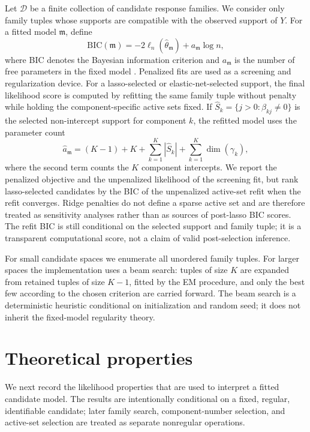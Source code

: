 Let \(\mathcal D\) be a finite collection of candidate response families.  We
consider only family tuples whose supports are compatible with the observed
support of \(Y\).  For a fitted model \(\mathfrak m\), define
\[
    \mathrm{BIC}(\mathfrak m)
    =
    -2\ell_n(\hat\theta_{\mathfrak m})
    +
    a_{\mathfrak m}\log n,
\]
where BIC denotes the Bayesian information criterion and
\(a_{\mathfrak m}\) is the number of free parameters in the fixed model
\citep{schwarz1978dimensions}.
Penalized fits are used as a screening and regularization device.  For a
lasso-selected or elastic-net-selected support, the final likelihood score is
computed by refitting the same family tuple without penalty while holding the
component-specific active sets fixed.  If
\(\hat S_k=\{j>0:\hat\beta_{kj}\neq0\}\) is the selected non-intercept support
for component \(k\), the refitted model uses the parameter count
\[
    \hat a_{\mathfrak m}
    =
    (K-1)
    +K
    +
    \sum_{k=1}^K
    |\hat S_k|
    +
    \sum_{k=1}^K\dim(\gamma_k),
\]
where the second term counts the \(K\) component intercepts.  We report the
penalized objective and the unpenalized likelihood of the screening fit, but
rank lasso-selected candidates by the BIC of the unpenalized active-set refit
when the refit converges.  Ridge penalties do not define a sparse active set
and are therefore treated as sensitivity analyses rather than as sources of
post-lasso BIC scores.  The refit BIC is still conditional on the selected
support and family tuple; it is a transparent computational score, not a claim
of valid post-selection inference.

For small candidate spaces we enumerate all unordered family tuples.  For
larger spaces the implementation uses a beam search: tuples of size \(K\) are
expanded from retained tuples of size \(K-1\), fitted by the EM procedure, and
only the best few according to the chosen criterion are carried forward.  The
beam search is a deterministic heuristic conditional on initialization and
random seed; it does not inherit the fixed-model regularity theory.

\section{Theoretical properties}
\label{sec:theory}

We next record the likelihood properties that are used to interpret a fitted
candidate model.  The results are intentionally conditional on a fixed,
regular, identifiable candidate; later family search, component-number
selection, and active-set selection are treated as separate nonregular
operations.

